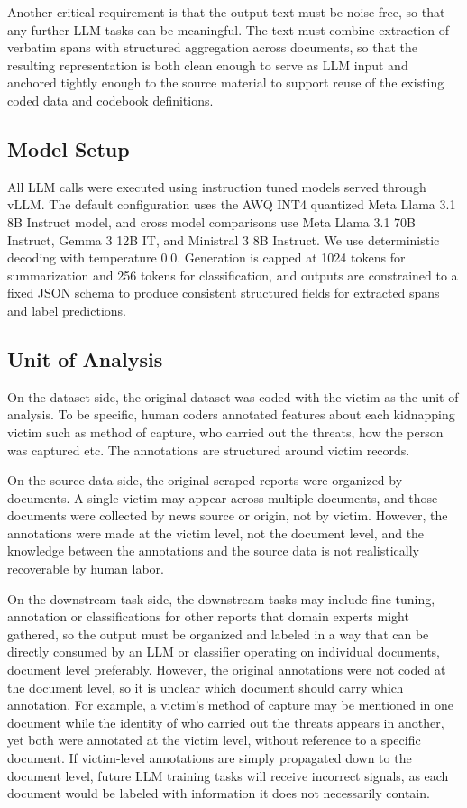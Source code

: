 \documentclass{article}
\begin{document}
Another critical requirement is that the output text must be noise-free,
so that any further LLM tasks can be meaningful. The text must combine
extraction of verbatim spans with structured aggregation across
documents, so that the resulting representation is both clean enough to
serve as LLM input and anchored tightly enough to the source material to
support reuse of the existing coded data and codebook definitions.


\subsection{Model Setup}\label{model-setup}

All LLM calls were executed using instruction tuned models served
through vLLM. The default configuration uses the AWQ INT4 quantized Meta
Llama 3.1 8B Instruct model, and cross model comparisons use Meta Llama
3.1 70B Instruct, Gemma 3 12B IT, and Ministral 3 8B Instruct. We use
deterministic decoding with temperature 0.0. Generation is capped at
1024 tokens for summarization and 256 tokens for classification, and
outputs are constrained to a fixed JSON schema to produce consistent
structured fields for extracted spans and label predictions.

\subsection{Unit of Analysis}\label{unit-of-analysis}

On the dataset side, the original dataset was coded with the victim as
the unit of analysis. To be specific, human coders annotated features
about each kidnapping victim such as method of capture, who carried out
the threats, how the person was captured etc. The annotations are
structured around victim records.

On the source data side, the original scraped reports were organized by
documents. A single victim may appear across multiple documents, and
those documents were collected by news source or origin, not by victim.
However, the annotations were made at the victim level, not the document
level, and the knowledge between the annotations and the source data is
not realistically recoverable by human labor.

On the downstream task side, the downstream tasks may include
fine-tuning, annotation or classifications for other reports that domain
experts might gathered, so the output must be organized and labeled in a
way that can be directly consumed by an LLM or classifier operating on
individual documents, document level preferably. However, the original
annotations were not coded at the document level, so it is unclear which
document should carry which annotation. For example, a victim's method
of capture may be mentioned in one document while the identity of who
carried out the threats appears in another, yet both were annotated at
the victim level, without reference to a specific document. If
victim-level annotations are simply propagated down to the document
level, future LLM training tasks will receive incorrect signals, as each
document would be labeled with information it does not necessarily
contain.
\end{document}
